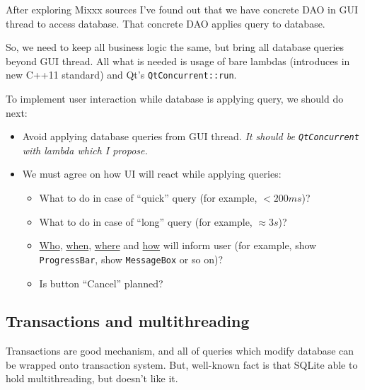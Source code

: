\documentclass[a4paper,12pt]{scrartcl}
\begin{document}
After exploring Mixxx sources I've found out that we have concrete DAO in GUI thread to access database. 
That concrete DAO applies query to database.

So, we need to keep all business logic the same, but bring all database queries beyond GUI thread. 
All what is needed is usage of bare lambdas (introduces in new C++11 standard) and Qt's \texttt{QtConcurrent::run}.

To implement user interaction while database is applying query, we should do next:
\begin{itemize}
 \item Avoid applying database queries from GUI thread. \textit{It should be \texttt{QtConcurrent} with 
    lambda which I propose.}
 \item We must agree on how UI will react while applying queries:
 \begin{itemize}
  \item What to do in case of ``quick'' query (for example, $< 200 ms$)?
  \item What to do in case of ``long'' query (for example, $\approx 3 s$)?
  \item \underline{Who}, \underline{when}, \underline{where} and \underline{how} will inform user 
    (for example, show \texttt{ProgressBar}, show \texttt{MessageBox} or so on)?
  \item Is button ``Cancel'' planned?
 \end{itemize}
\end{itemize}

\subsection{Transactions and multithreading}
Transactions are good mechanism, and all of queries which modify database can be wrapped onto transaction 
system. But, well-known fact is that SQLite able to hold multithreading, but doesn't like it.
\end{document}
